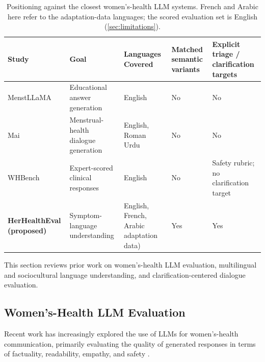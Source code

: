 \begin{table}[t]
\centering
\small
\begin{tabular}{p{}p{}p{}p{}p{}}
\hline
\textbf{Study} & \textbf{Goal} & \textbf{Languages Covered} & \textbf{Matched semantic variants} & \textbf{Explicit triage / clarification targets} \\
\hline
MenstLLaMA \citep{adhikary-etal-2025-menstrual} & Educational answer generation & English & No & No \\
Mai \citep{mughal-etal-2025-mai} & Menstrual-health dialogue generation & English, Roman Urdu & No & No \\
WHBench \citep{maurya-etal-2026-whbench} & Expert-scored clinical responses & English & No & Safety rubric; no clarification target \\
\textbf{HerHealthEval (proposed)} & Symptom-language understanding & English, French, Arabic adaptation data) & Yes & Yes \\
\hline
\end{tabular}
\caption{Positioning against the closest women's-health LLM systems. French and Arabic here refer to the adaptation-data languages; the scored evaluation set is English (\ref{sec:limitations}).}
\label{tab:positioning}
\end{table}

This section reviews prior work on women's-health LLM evaluation,
multilingual and sociocultural language understanding, and
clarification-centered dialogue evaluation.
\subsection{Women's-Health LLM Evaluation}

Recent work has increasingly explored the use of LLMs for women's-health communication, primarily evaluating the quality of generated responses in terms of factuality, readability, empathy, and safety \citep{recker-etal-2025-large,devries-etal-2025-enhancing}.

